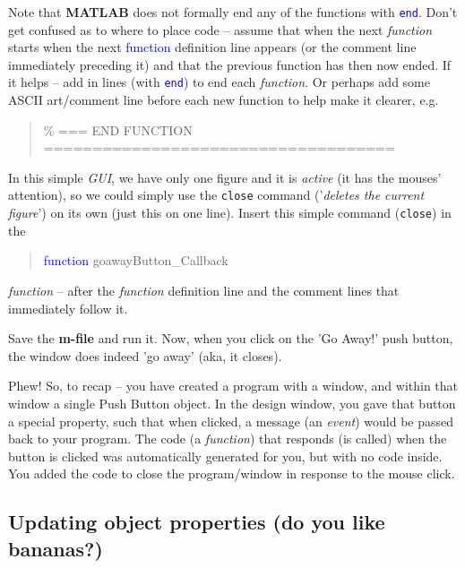\documentclass{tufte-book} %
\newenvironment{docspec}{\begin{quotation}\ttfamily\parskip0pt\parindent0pt\ignorespaces}{\end{quotation}}
\begin{document}
Note that \textbf{MATLAB} does not formally end any of the functions with \textcolor{blue}{\texttt{end}}. Don't get confused as to where to place code -- assume that when the next \textit{function} starts when the next \textcolor{blue}{function} definition line appears (or the comment line immediately preceding it) and that the previous function has then now ended. If it helps -- add in lines (with \textcolor{blue}{\texttt{end}}) to end each \textit{function}. Or perhaps add some ASCII art/comment line before each new function to help make it clearer, e.g.
\begin{docspec}
\textcolor[rgb]{0,0.501961,0}{\% === END FUNCTION ====================================}
\end{docspec}
In this simple \textit{GUI}, we have only one figure and it is \textit{active} (it has the mouses' attention), so we could simply use the \texttt{close} command ('\textit{deletes the current figure}') on its own (just this on one line). 
Insert this simple command (\texttt{close}) in the
\begin{docspec}
\textcolor{blue}{function} goawayButton\_Callback
\end{docspec}
 \textit{function} -- after the \textit{function} definition line and the comment lines that immediately follow it.

Save the \textbf{m-file} and run it. Now, when you click on the 'Go Away!' push button, the window does indeed 'go away' (aka, it closes).

Phew! So, to recap -- you have created a program with a window, and within that window a single \textsf{Push Button} object.
In the design window, you gave that button a special property, such that when clicked, a message (an \textit{event}) would be passed back to your program. The code (a \textit{function}) that responds (is called) when the button is clicked was automatically generated for you, but with no code inside. You added the code to close the program/window in response to the mouse click.


\newpage
\subsection{Updating object properties (do you like bananas?)}
\end{document}
